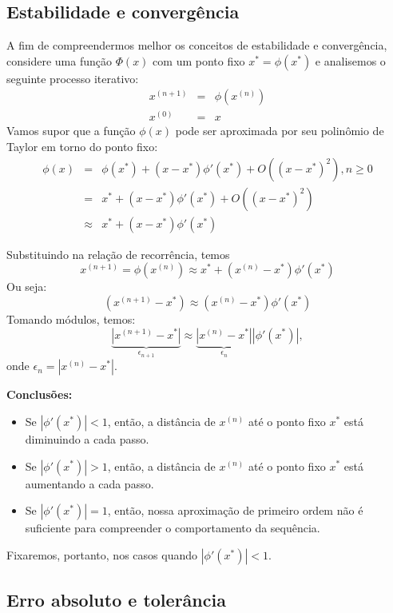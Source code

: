 \subsection{Estabilidade e convergência}

A fim de compreendermos melhor os conceitos de estabilidade e convergência, considere uma função $\Phi(x)$ com um ponto fixo $x^*=\phi(x^*)$ e analisemos o seguinte processo iterativo:
\begin{eqnarray*}
x^{(n+1)}&=&\phi\left(x^{(n)}\right)\\
x^{(0)}&=&x
\end{eqnarray*}
Vamos supor que a função $\phi(x)$ pode ser aproximada por seu polinômio de Taylor em torno do ponto fixo:
\begin{eqnarray*}
\phi(x)&=&\phi(x^*)+(x-x^*) \phi'(x^*)+O\left((x-x^*)^2\right), n\geq 0\\
&=&x^*+(x-x^*) \phi'(x^*)+O\left((x-x^*)^2\right)\\
&\approx& x^*+(x-x^*) \phi'(x^*)
\end{eqnarray*}

Substituindo na relação de recorrência, temos
$$
x^{(n+1)}=\phi\left(x^{(n)}\right)\approx x^*+(x^{(n)}-x^*) \phi'(x^*)
$$
Ou seja:
$$
\left(x^{(n+1)}-x^*\right)\approx {(x^{(n)}-x^*)} \phi'(x^*)
$$
Tomando módulos, temos:
$$
\underbrace{\left|x^{(n+1)}-x^*\right|}_{\epsilon_{n+1}}\approx \underbrace{\left|x^{(n)}-x^*\right|}_{\epsilon_n} \left|\phi'(x^*)\right|,
$$
onde $\epsilon_n=\left|x^{(n)}-x^*\right|$.

{\bf Conclusões:}
\begin{itemize}
\item Se $|\phi'(x^*)|<1$, então, a distância de $x^{(n)}$ até o ponto fixo $x^*$ está diminuindo a cada passo.
\item Se $|\phi'(x^*)|>1$, então, a distância de $x^{(n)}$ até o ponto fixo $x^*$ está aumentando a cada passo.
\item Se $|\phi'(x^*)|=1$, então, nossa aproximação de primeiro ordem não é suficiente para compreender o comportamento da sequência.
\end{itemize}

Fixaremos, portanto, nos casos quando $|\phi'(x^*)|<1$.

\subsection{Erro absoluto e tolerância}

